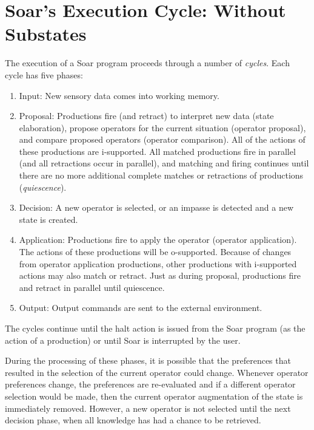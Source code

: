 \section{Soar's Execution Cycle: Without Substates}
\label{ARCH-decision}

The execution of a Soar program proceeds through a number of
\emph{cycles}. Each cycle has five phases:
\begin{enumerate} 
\item Input: New sensory data comes into working memory.
\item Proposal: Productions fire (and retract) to interpret new data (state 
elaboration), propose operators for the current situation (operator
proposal), and compare proposed operators (operator comparison).  All of
the actions of these productions are i-supported.  All matched
productions fire in parallel (and all retractions occur in parallel),
and matching and firing continues until there are no more additional
complete matches or retractions of productions (\emph{quiescence}).
\item Decision: A new operator is selected, or an impasse is detected
and a new state is created.
\item Application: Productions fire to apply the operator (operator
application).  The actions of these productions will be o-supported.
Because of changes from operator application productions, other
productions with i-supported actions may also match or retract. Just as
during proposal, productions fire and retract in parallel until quiescence.
\item Output: Output commands are sent to the external environment.
\end{enumerate}

The cycles continue until the halt action is issued from
the Soar program (as the action of a production) or until Soar is interrupted 
by the user.

During the processing of these phases, it is possible that the
preferences that resulted in the selection of the current operator could
change.  Whenever operator preferences change, the preferences are
re-evaluated and if a different operator selection would be made, then
the current operator augmentation of the state is immediately removed.
However, a new operator is not selected until the next decision phase, when
all knowledge has had a chance to be retrieved.

\begin{figure}
\label{fig:decisioncycle}
\end{figure}

